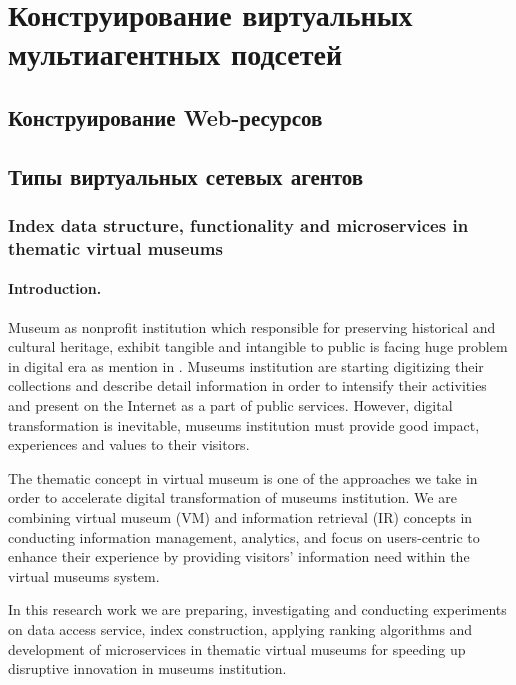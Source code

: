 \chapter{Конструирование виртуальных мультиагентных подсетей}\label{ch:ch4}

\section{Конструирование Web-ресурсов}\label{sec:ch4/sect1}

\section{Типы виртуальных сетевых агентов}\label{sec:ch4/sect2}

\subsection{Index data structure, functionality and microservices in thematic virtual museums}\label{subsec:ch4/sec2/sub1}

\subsubsection{Introduction.} Museum as nonprofit institution which responsible for preserving historical and cultural heritage, exhibit tangible and intangible to public is facing huge problem in digital era as mention in \cite{AnggaiBlekanovSergeev2014}. Museums institution are starting digitizing their collections and describe detail information in order to intensify their activities and present on the Internet as a part of public services. However, digital transformation is inevitable, museums institution must provide good impact, experiences and values to their visitors.

The thematic concept in virtual museum is one of the approaches we take in order to accelerate digital transformation of museums institution. We are combining virtual museum (VM) and information retrieval (IR) concepts in conducting information management, analytics, and focus on users-centric to enhance their experience by providing visitors’ information need within the virtual museums system.

In this research work we are preparing, investigating and conducting experiments on data access service, index construction, applying ranking algorithms and development of microservices in thematic virtual museums for speeding up disruptive innovation in museums institution.

